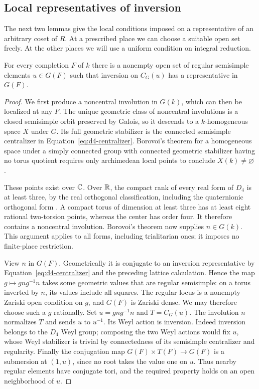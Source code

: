 \subsection{Local representatives of inversion}

The next two lemmas give the local conditions imposed on a representative
of an arbitrary coset of $R$.  At a prescribed place we can choose a
suitable open set freely.  At the other places we will use a uniform
condition on integral reduction.

\begin{lemma}\label{lem:d4-local-openings}
For every completion $F$ of $k$ there is a nonempty open set of regular
semisimple elements $u\in G(F)$ such that inversion on $C_G(u)$ has a
representative in $G(F)$.
\end{lemma}

\begin{proof}
We first produce a noncentral involution in $G(k)$, which can then be
localized at any $F$.  The unique geometric class of noncentral
involutions is a closed semisimple orbit preserved by Galois, so it
descends to a $k$-homogeneous space $X$ under $G$.  Its full geometric
stabilizer is the connected semisimple centralizer in
Equation~\eqref{eq:d4-centralizer}.  Borovoi's theorem for a homogeneous
space under a simply connected group with connected geometric
stabilizer having no torus quotient requires only archimedean local
points to conclude $X(k)\ne\varnothing$
\cite[Proposition~3.4(i)]{Borovoi}.

These points exist over $\mathbb C$.  Over $\mathbb R$, the compact rank of every
real form of $D_4$ is at least three, by the real orthogonal
classification, including the quaternionic orthogonal form
\cite{KMRT,PRbook}.  A compact torus of dimension at least three has at
least eight rational two-torsion points, whereas the center has order
four.  It therefore contains a noncentral involution.  Borovoi's theorem
now supplies $n\in G(k)$.  This argument applies to all forms, including
trialitarian ones; it imposes no finite-place restriction.

View $n$ in $G(F)$.  Geometrically it is conjugate
to an inversion representative by Equation~\eqref{eq:d4-centralizer} and
the preceding lattice calculation.  Hence the map
$g\mapsto gng^{-1}n$ takes some geometric values that are regular
semisimple: on a torus inverted by $n$, its values include all squares.
The regular locus is a nonempty Zariski open condition on $g$, and
$G(F)$ is Zariski dense.  We may therefore choose such a $g$ rationally.
Set $u=gng^{-1}n$ and $T=C_G(u)$.  The involution $n$ normalizes $T$ and
sends $u$ to $u^{-1}$.  Its Weyl action is inversion.  Indeed inversion
belongs to the $D_4$ Weyl group; composing the two Weyl actions would fix
$u$, whose Weyl stabilizer is trivial by connectedness of its semisimple
centralizer and regularity.  Finally the conjugation map
$G(F)\times T(F)\to G(F)$ is a submersion at $(1,u)$, since no root takes
the value one on $u$.  Thus nearby regular elements have conjugate tori,
and the required property holds on an open neighborhood of $u$.
\end{proof}

